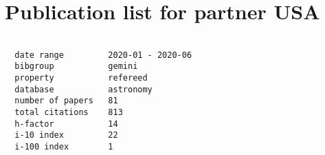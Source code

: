 \documentclass[twocolumn,linenumbers]{aastex63}
\begin{document}
\section*{Publication list for partner USA}

\begin{verbatim}

  date range         2020-01 - 2020-06
  bibgroup           gemini
  property           refereed
  database           astronomy
  number of papers   81
  total citations    813
  h-factor           14
  i-10 index         22
  i-100 index        1

\end{verbatim}

\vspace{4cm}

\nocite{*}


\end{document}
